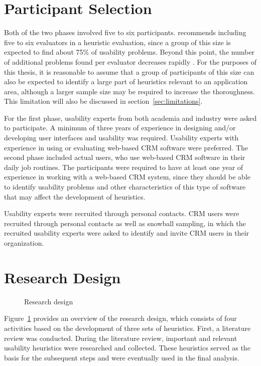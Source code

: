 \section{Participant Selection}
Both of the two phases involved five to six participants.  recommends including five to six evaluators in a heuristic evaluation, since a group of this size is expected to find about 75\% of usability problems. Beyond this point, the number of additional problems found per evaluator decreases rapidly \citep{Nielsen1993}. For the purposes of this thesis, it is reasonable to assume that a group of participants of this size can also be expected to identify a large part of heuristics relevant to an application area, although a larger sample size may be required to increase the thoroughness. This limitation will also be discussed in section~\ref{sec:limitations}.

For the first phase, usability experts from both academia and industry were asked to participate. A minimum of three years of experience in designing and/or developing user interfaces and usability was required. Usability experts with experience in using or evaluating web-based CRM software were preferred. The second phase included actual users, who use web-based CRM software in their daily job routines. The participants were required to have at least one year of experience in working with a web-based CRM system, since they should be able to identify usability problems and other characteristics of this type of software that may affect the development of heuristics.

Usability experts were recruited through personal contacts. CRM users were recruited through personal contacts as well as snowball sampling, in which the recruited usability experts were asked to identify and invite CRM users in their organization.

\section{Research Design}
\label{sec:research_design}

\begin{figure}[htbp]
	\centering
	
	\caption{Research design}
	\label{img:research_design}
\end{figure}

Figure~\ref{img:research_design} provides an overview of the research design, which consists of four activities based on the development of three sets of heuristics. First, a literature review was conducted. During the literature review, important and relevant usability heuristics were researched and collected. These heuristics served as the basis for the subsequent steps and were eventually used in the final analysis.

